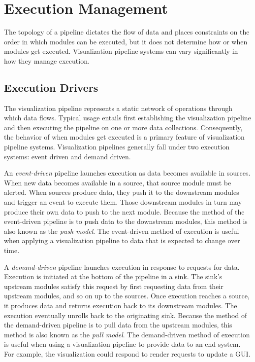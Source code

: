 \documentclass[journal,onecolumn,12pt,letterpaper,twoside]{IEEEtran}
\newcommand*{\keyterm}[1]{\emph{#1}}
\begin{document}
\section{Execution Management}
\label{sec:ExecutionManagement}

The topology of a pipeline dictates the flow of data and places constraints
on the order in which modules can be executed, but it does not determine
how or when modules get executed.  Visualization pipeline systems can
vary significantly in how they manage execution.

\subsection{Execution Drivers}
\label{sec:ExecutionDrivers}

The visualization pipeline represents a static network of operations
through which data flows.  Typical usage entails first establishing the
visualization pipeline and then executing the pipeline on one or more data
collections.  Consequently, the behavior of when modules get executed is
a primary feature of visualization pipeline systems.  Visualization
pipelines generally fall under two execution systems: event driven and
demand driven.

An \keyterm{event-driven} pipeline launches execution as data becomes
available in sources.  When new data becomes available in a source, that
source module must be alerted.  When sources produce data, they push it
to the downstream modules and trigger an event to execute them.  Those
downstream modules in turn may produce their own data to push to the
next module.  Because the method of the event-driven pipeline is to push
data to the downstream modules, this method is also known as the
\keyterm{push model}.  The event-driven method of execution is useful when
applying a visualization pipeline to data that is expected to change over
time.

A \keyterm{demand-driven} pipeline launches execution in response to
requests for data.  Execution is initiated at the bottom of the pipeline in
a sink.  The sink's upstream modules satisfy this request by first
requesting data from their upstream modules, and so on up to the
sources.  Once execution reaches a source, it produces data and returns
execution back to its downstream modules.  The execution eventually
unrolls back to the originating sink.  Because the method of the
demand-driven pipeline is to pull data from the upstream modules, this
method is also known as the \keyterm{pull model}.  The demand-driven method
of execution is useful when using a visualization pipeline to provide data
to an end system.  For example, the visualization could respond to render
requests to update a GUI.
\end{document}
